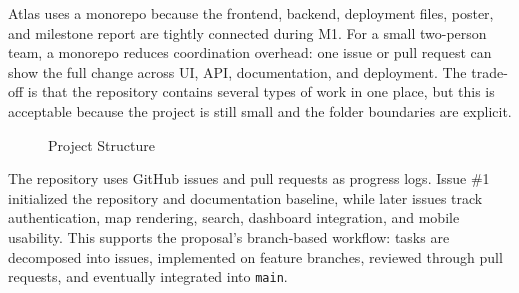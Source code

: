 \documentclass[11pt]{article}
\begin{document}
Atlas uses a monorepo because the frontend, backend, deployment files, poster, and milestone report are tightly connected during M1. For a small two-person team, a monorepo reduces coordination overhead: one issue or pull request can show the full change across UI, API, documentation, and deployment. The trade-off is that the repository contains several types of work in one place, but this is acceptable because the project is still small and the folder boundaries are explicit.

\begin{figure}[h]
    \centering
    \caption*{Project Structure}
\end{figure}

The repository uses GitHub issues and pull requests as progress logs. Issue \#1 initialized the repository and documentation baseline, while later issues track authentication, map rendering, search, dashboard integration, and mobile usability. This supports the proposal's branch-based workflow: tasks are decomposed into issues, implemented on feature branches, reviewed through pull requests, and eventually integrated into \texttt{main}.
\end{document}
